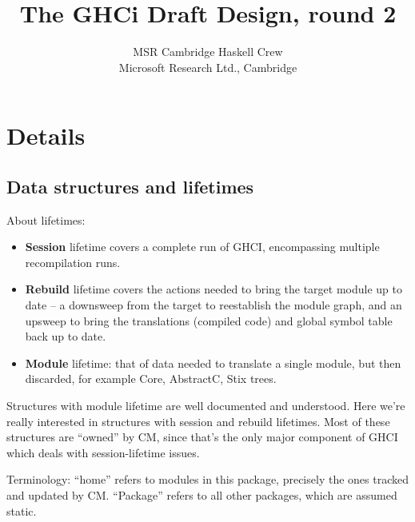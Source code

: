 \documentclass[11pt]{article}
\begin{document}
\title{The GHCi Draft Design, round 2}
\author{MSR Cambridge Haskell Crew \\
        Microsoft Research Ltd., Cambridge}

\maketitle



\section{Details}

\subsection{Data structures and lifetimes}

About lifetimes:
\begin{itemize}
\item {\bf Session} lifetime covers a complete run of GHCI, 
      encompassing multiple recompilation runs.
\item {\bf Rebuild} lifetime covers the actions needed to bring
      the target module up to date -- a downsweep from the 
      target to reestablish the module graph, and an upsweep to
      bring the translations (compiled code) and global symbol
      table back up to date.
\item {\bf Module} lifetime: that of data needed to translate
      a single module, but then discarded, for example Core,
      AbstractC, Stix trees.
\end{itemize}

Structures with module lifetime are well documented and understood.
Here we're really interested in structures with session and rebuild
lifetimes.  Most of these structures are ``owned'' by CM, since that's
the only major component of GHCI which deals with session-lifetime
issues. 

Terminology: ``home'' refers to modules in this package, precisely
the ones tracked and updated by CM.  ``Package'' refers to all other
packages, which are assumed static.
\end{document}

